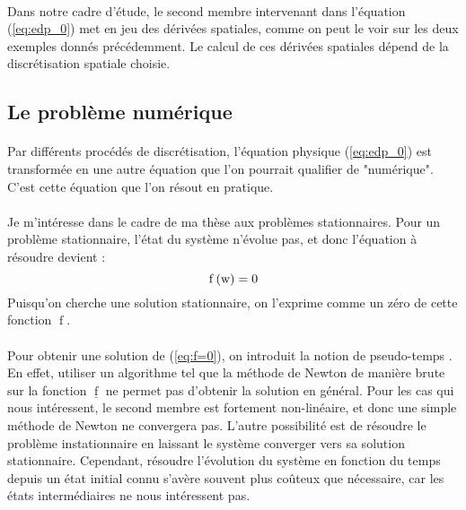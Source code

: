 		\paragraph{}
		Dans notre cadre d'étude, le second membre intervenant dans l'équation (\ref{eq:edp_0}) met en jeu des dérivées spatiales, comme on peut le voir sur les deux exemples donnés précédemment.
		Le calcul de ces dérivées spatiales dépend de la discrétisation spatiale choisie.


	\subsection{Le problème numérique}

		\paragraph{}
		Par différents procédés de discrétisation, l'équation physique (\ref{eq:edp_0}) est transformée en une autre équation que l'on pourrait qualifier de "numérique".
		C'est cette équation que l'on résout en pratique.

		\paragraph{}
		Je m'intéresse dans le cadre de ma thèse aux problèmes stationnaires.
		Pour un problème stationnaire, l'état du système n'évolue pas, et donc l'équation à résoudre devient :
		\begin{equation}\label{eq:f=0}
			\operatorname{f}\left(\textup{w}\right) = 0
		\end{equation}
		Puisqu'on cherche une solution stationnaire, on l'exprime comme un zéro de cette fonction $\operatorname{f}$.

		\paragraph{}
		Pour obtenir une solution de (\ref{eq:f=0}), on introduit la notion de pseudo-temps \cite{KelleyKeyes1996}.
		En effet, utiliser un algorithme tel que la méthode de Newton de manière brute sur la fonction $\underline{\operatorname{f}}$ ne permet pas d'obtenir la solution en général.
		Pour les cas qui nous intéressent, le second membre est fortement non-linéaire, et donc une simple méthode de Newton ne convergera pas.
		L'autre possibilité est de résoudre le problème instationnaire en laissant le système converger vers sa solution stationnaire.
		Cependant, résoudre l'évolution du système en fonction du temps depuis un état initial connu s'avère souvent plus coûteux que nécessaire, car les états intermédiaires ne nous intéressent pas.


